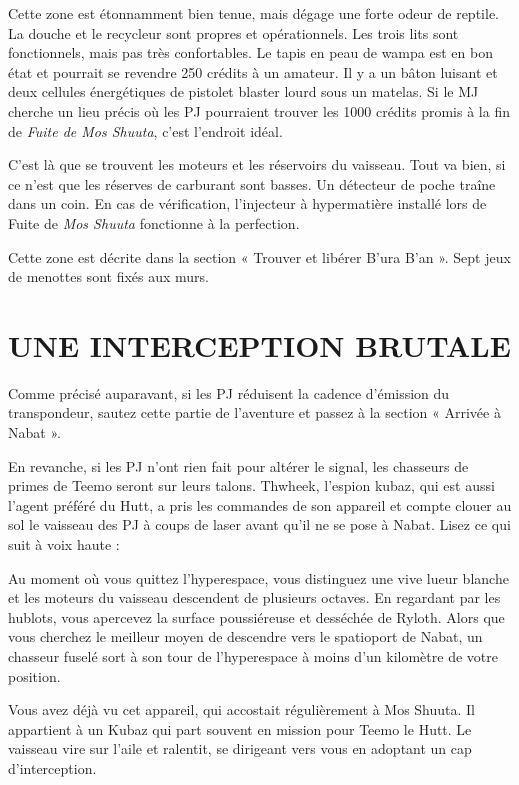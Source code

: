 \documentclass[a4paper,10pt,twoside,twocolumn,openany]{book}
\begin{document}
\subtitle{QUARTIERS DE L’ÉQUIPAGE}
Cette zone est étonnamment bien tenue, mais dégage
une forte odeur de reptile. La douche et le recycleur sont
propres et opérationnels. Les trois lits sont fonctionnels,
mais pas très confortables. Le tapis en peau de wampa
est en bon état et pourrait se revendre 250 crédits à un
amateur. Il y a un bâton luisant et deux cellules énergétiques de pistolet blaster lourd sous un matelas. Si le MJ
cherche un lieu précis où les PJ pourraient trouver les
1000 crédits promis à la fin de \textit{Fuite de Mos Shuuta},
c’est l’endroit idéal.

\subtitle{SALLE DES MACHINES}
C’est là que se trouvent les moteurs et les réservoirs du
vaisseau. Tout va bien, si ce n’est que les réserves de
carburant sont basses. Un détecteur de poche traîne
dans un coin. En cas de vérification, l’injecteur à hypermatière installé lors de Fuite de \textit{Mos Shuuta} fonctionne à la perfection.

\subtitle{SOUTE 3}
Cette zone est décrite dans la section « Trouver et libérer
B’ura B’an ». Sept jeux de menottes sont fixés aux murs.

\section{UNE INTERCEPTION
BRUTALE}
Comme précisé auparavant, si les PJ réduisent la cadence d’émission du transpondeur, sautez cette partie
de l’aventure et passez à la section « Arrivée à Nabat ».

En revanche, si les PJ n’ont rien fait pour altérer le signal, les chasseurs de primes de Teemo seront sur leurs
talons. Thwheek, l’espion kubaz, qui est aussi l’agent
préféré du Hutt, a pris les commandes de son appareil
et compte clouer au sol le vaisseau des PJ à coups de
laser avant qu’il ne se pose à Nabat. Lisez ce qui suit à
voix haute :

\begin{quotebox}
    
Au moment où vous quittez l’hyperespace, vous
distinguez une vive lueur blanche et les moteurs
du vaisseau descendent de plusieurs octaves. En
regardant par les hublots, vous apercevez la surface poussiéreuse et desséchée de Ryloth. Alors
que vous cherchez le meilleur moyen de descendre vers le spatioport de Nabat, un chasseur
fuselé sort à son tour de l’hyperespace à moins
d’un kilomètre de votre position.

Vous avez déjà vu cet appareil, qui accostait régulièrement à Mos Shuuta. Il appartient à un Kubaz
qui part souvent en mission pour Teemo le Hutt. Le
vaisseau vire sur l’aile et ralentit, se dirigeant vers
vous en adoptant un cap d’interception.\end{quotebox}
\end{document}
